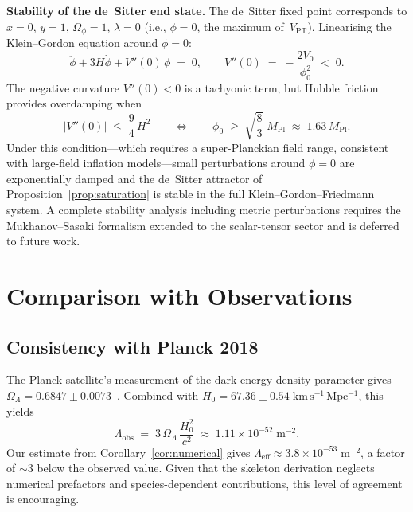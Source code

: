 \documentclass[12pt,a4paper]{article}
\theoremstyle{definition}
\theoremstyle{plain}
\theoremstyle{remark}
\newcommand{\Leff}{\Lambda_{\mathrm{eff}}}
\begin{document}
\medskip
\noindent\textbf{Stability of the de~Sitter end state.}\;
The de~Sitter fixed point corresponds to $x = 0$, $y = 1$,
$\Omega_\phi = 1$, $\lambda = 0$ (i.e., $\phi = 0$, the maximum
of~$V_{\mathrm{PT}}$).  Linearising the Klein--Gordon equation around
$\phi = 0$:
\begin{equation}
  \ddot\phi + 3H\dot\phi + V''(0)\,\phi \;=\; 0,
  \qquad
  V''(0) \;=\; -\frac{2V_0}{\phi_0^2} \;<\; 0.
\end{equation}
The negative curvature $V''(0) < 0$ is a tachyonic term, but Hubble
friction provides overdamping when
\begin{equation}\label{eq:stability-condition}
  |V''(0)| \;\le\; \frac{9}{4}\,H^2
  \qquad\Longleftrightarrow\qquad
  \phi_0 \;\ge\; \sqrt{\frac{8}{3}}\;M_{\mathrm{Pl}}
  \;\approx\; 1.63\,M_{\mathrm{Pl}}.
\end{equation}
Under this condition---which requires a super-Planckian field range,
consistent with large-field inflation models---small perturbations
around $\phi = 0$ are exponentially damped and the de~Sitter attractor
of Proposition~\ref{prop:saturation} is stable in the full
Klein--Gordon--Friedmann system.  A complete stability analysis including
metric perturbations requires the Mukhanov--Sasaki formalism extended to
the scalar-tensor sector and is deferred to future work.

\section{Comparison with Observations}\label{sec:observations}

\subsection{Consistency with Planck 2018}

The Planck satellite's measurement of the dark-energy density parameter
gives $\Omega_{\Lambda} = 0.6847 \pm 0.0073$~\cite{Planck2018}.
Combined with $H_0 = 67.36 \pm 0.54\;\mathrm{km\,s^{-1}\,Mpc^{-1}}$,
this yields
\begin{equation}
  \Lambda_{\mathrm{obs}} \;=\; 3\,\Omega_{\Lambda}\,
  \frac{H_0^{2}}{c^{2}}
  \;\approx\; 1.11 \times 10^{-52}\;\mathrm{m}^{-2}.
\end{equation}
Our estimate from Corollary~\ref{cor:numerical} gives
$\Leff \approx 3.8 \times 10^{-53}\;\mathrm{m}^{-2}$, a factor of
$\sim 3$ below the observed value. Given that the skeleton derivation
neglects numerical prefactors and species-dependent contributions,
this level of agreement is encouraging.
\end{document}
